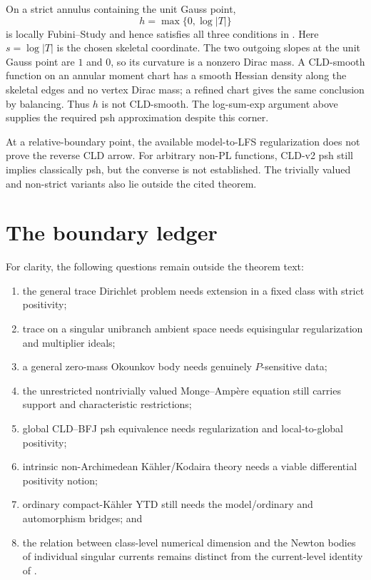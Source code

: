 \begin{example}
\label{ex:verified-pl-nonsmooth}
On a strict annulus containing the unit Gauss point,
\[
                         h=\max\{0,\log|T|\}
\]
is locally Fubini--Study and hence satisfies all three conditions in
.  Here $s=\log|T|$ is the chosen skeletal coordinate. The two outgoing
slopes at the unit Gauss point are $1$ and $0$, so its curvature is a
nonzero Dirac mass. A CLD-smooth function on an annular moment chart has
a smooth Hessian density along the skeletal edges and no vertex Dirac
mass; a refined chart gives the same conclusion by balancing. Thus $h$
is not CLD-smooth. The log-sum-exp argument above supplies the required
psh approximation despite this corner.
\end{example}

\begin{remark}
\label{rem:verified-pl-remaining-arrows}
At a relative-boundary point, the available model-to-LFS regularization does
not prove the reverse CLD arrow.  For arbitrary non-PL functions, CLD-v2 psh
still implies classically psh, but the converse is not established.  The
trivially valued and non-strict variants also lie outside the cited theorem.
\end{remark}

\section{The boundary ledger}
\label{sec:verified-boundary-ledger}

For clarity, the following questions remain outside the theorem text:
\begin{enumerate}
\item the general trace Dirichlet problem needs extension in a fixed
      class with strict positivity;
\item trace on a singular unibranch ambient space needs equisingular
      regularization and multiplier ideals;
\item a general zero-mass Okounkov body needs genuinely
      $P$-sensitive data;
\item the unrestricted nontrivially valued Monge--Amp\`ere equation
      still carries support and characteristic restrictions;
\item global CLD--BFJ psh equivalence needs regularization and
      local-to-global positivity;
\item intrinsic non-Archimedean K\"ahler/Kodaira theory needs a viable
      differential positivity notion;
\item ordinary compact-K\"ahler YTD still needs the model/ordinary and
      automorphism bridges; and
\item the relation between class-level numerical dimension and the Newton
      bodies of individual singular currents remains distinct from the
      current-level identity of .
\end{enumerate}


